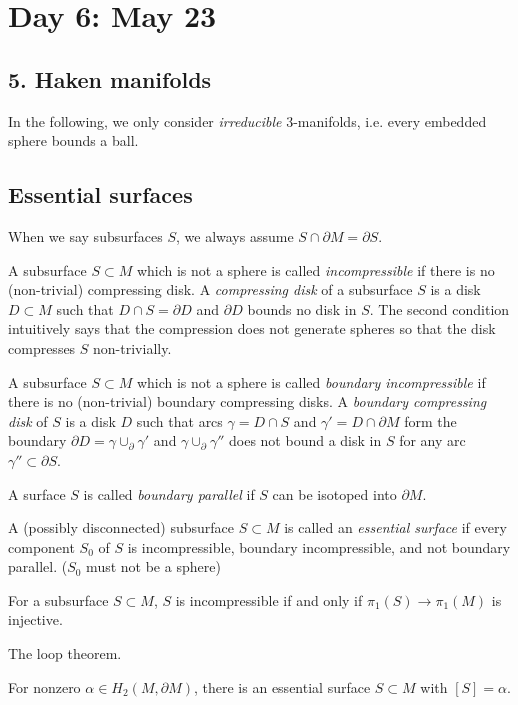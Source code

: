 \documentclass{../../small}
\begin{document}
\newpage
\setcounter{section}{5}
\section{Day 6: May 23}
\setcounter{section}{5}
\subsection*{5. Haken manifolds}
In the following, we only consider \emph{irreducible} 3-manifolds, i.e. every embedded sphere bounds a ball.

\subsection{Essential surfaces}
When we say subsurfaces $S$, we always assume $S\cap\partial M=\partial S$.

A subsurface $S\subset M$ which is not a sphere is called \emph{incompressible} if there is no (non-trivial) compressing disk.
A \emph{compressing disk} of a subsurface $S$ is a disk $D\subset M$ such that $D\cap S=\partial D$ and $\partial D$ bounds no disk in $S$.
The second condition intuitively says that the compression does not generate spheres so that the disk compresses $S$ non-trivially.

A subsurface $S\subset M$ which is not a sphere is called \emph{boundary incompressible} if there is no (non-trivial) boundary compressing disks.
A \emph{boundary compressing disk} of $S$ is a disk $D$ such that arcs $\gamma=D\cap S$ and $\gamma'=D\cap\partial M$ form the boundary $\partial D=\gamma\cup_\partial\gamma'$ and $\gamma\cup_\partial\gamma''$ does not bound a disk in $S$ for any arc $\gamma''\subset\partial S$.

A surface $S$ is called \emph{boundary parallel} if $S$ can be isotoped into $\partial M$.

A (possibly disconnected) subsurface $S\subset M$ is called an \emph{essential surface} if every component $S_0$ of $S$ is incompressible, boundary incompressible, and not boundary parallel. ($S_0$ must not be a sphere)

\begin{prop}
For a subsurface $S\subset M$, $S$ is incompressible if and only if $\pi_1(S)\to\pi_1(M)$ is injective.
\end{prop}
\begin{pf}
The loop theorem.
\end{pf}
\begin{prop}
For nonzero $\alpha\in H_2(M,\partial M)$, there is an essential surface $S\subset M$ with $[S]=\alpha$.
\end{prop}
\end{document}
